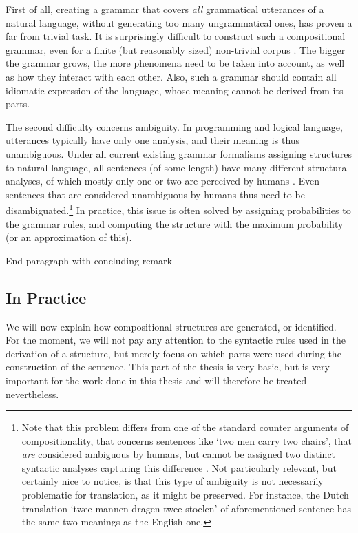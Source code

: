 \documentclass{report}
\theoremstyle{definition}
\theoremstyle{plain}
\begin{document}
First of all, creating a grammar that covers \textit{all} grammatical utterances of a natural language, without generating too many ungrammatical ones, has proven a far from trivial task. It is surprisingly difficult to construct such a compositional grammar, even for a finite (but reasonably sized) non-trivial corpus \citep{scha1990taaltheorie}. The bigger the grammar grows, the more phenomena need to be taken into account, as well as how they interact with each other. Also, such a grammar should contain all idiomatic expression of the language, whose meaning cannot be derived from its parts.

The second difficulty concerns ambiguity. In programming and logical language, utterances typically have only one analysis, and their meaning is thus unambiguous. Under all current existing grammar formalisms assigning structures to natural language, all sentences (of some length) have many different structural analyses, of which mostly only one or two are perceived by humans \citep{scha1990taaltheorie}. Even sentences that are considered unambiguous by humans thus need to be disambiguated.\footnote{Note that this problem differs from one of the standard counter arguments of compositionality, that concerns sentences like `two men carry two chairs', that \textit{are} considered ambiguous by humans, but cannot be assigned two distinct syntactic analyses capturing this difference \citep{pelletier1994principle}. Not particularly relevant, but certainly nice to notice, is that this type of ambiguity is not necessarily problematic for translation, as it might be preserved. For instance, the Dutch translation `twee mannen dragen twee stoelen' of aforementioned sentence has the same two meanings as the English one.} In practice, this issue is often solved by assigning probabilities to the grammar rules, and computing the structure with the maximum probability (or an approximation of this).

End paragraph with concluding remark


\subsection{In Practice}

We will now explain how compositional structures are generated, or identified. For the moment, we will not pay any attention to the syntactic rules used in the derivation of a structure, but merely focus on which parts were used during the construction of the sentence. This part of the thesis is very basic, but is very important for the work done in this thesis and will therefore be treated nevertheless.
\end{document}
